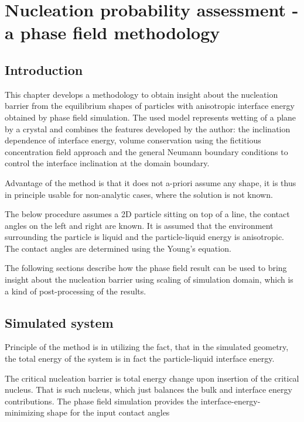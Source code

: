 \chapter{Nucleation probability assessment - a phase field methodology}
\section{Introduction}
This chapter develops a methodology to obtain insight about the nucleation barrier from the equilibrium shapes of particles with anisotropic interface energy obtained by phase field simulation. The used model represents wetting of a plane by a crystal and combines the features developed by the author: the inclination dependence of interface energy, volume conservation using the fictitious concentration field approach and the general Neumann boundary conditions to control the interface inclination at the domain boundary. 

Advantage of the method is that it does not a-priori assume any shape, it is thus in principle usable for non-analytic cases, where the solution is not known.

The below procedure assumes a 2D particle sitting on top of a line, the contact angles on the left and right are known. It is assumed that the environment surrounding the particle is liquid and the particle-liquid energy is anisotropic. The contact angles are determined using the Young's equation. 

The following sections describe how the phase field result can be used to bring insight about the nucleation barrier using scaling of simulation domain, which is a kind of post-processing of the results. 

\section{Simulated system}
Principle of the method is in utilizing the fact, that in the simulated geometry, the total energy of the system is in fact the particle-liquid interface energy. 

\alert{The critical nucleation barrier is total energy change upon insertion of the critical nucleus. That is such nucleus, which just balances the bulk and interface energy contributions. The phase field simulation provides the interface-energy-minimizing shape for the input contact angles}

